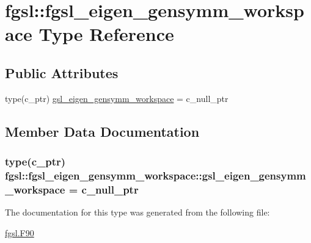 \hypertarget{structfgsl_1_1fgsl__eigen__gensymm__workspace}{}\section{fgsl\+:\+:fgsl\+\_\+eigen\+\_\+gensymm\+\_\+workspace Type Reference}
\label{structfgsl_1_1fgsl__eigen__gensymm__workspace}
\subsection*{Public Attributes}
\begin{DoxyCompactItemize}
\item 
type(c\+\_\+ptr) \hyperlink{structfgsl_1_1fgsl__eigen__gensymm__workspace_af54735f9be07ab0669882fef98e7a790}{gsl\+\_\+eigen\+\_\+gensymm\+\_\+workspace} = c\+\_\+null\+\_\+ptr
\end{DoxyCompactItemize}


\subsection{Member Data Documentation}
\hypertarget{structfgsl_1_1fgsl__eigen__gensymm__workspace_af54735f9be07ab0669882fef98e7a790}{}
\subsubsection[{gsl\+\_\+eigen\+\_\+gensymm\+\_\+workspace}]{\setlength{\rightskip}{0pt plus 5cm}type(c\+\_\+ptr) fgsl\+::fgsl\+\_\+eigen\+\_\+gensymm\+\_\+workspace\+::gsl\+\_\+eigen\+\_\+gensymm\+\_\+workspace = c\+\_\+null\+\_\+ptr}\label{structfgsl_1_1fgsl__eigen__gensymm__workspace_af54735f9be07ab0669882fef98e7a790}


The documentation for this type was generated from the following file\+:\begin{DoxyCompactItemize}
\item 
\hyperlink{fgsl_8F90}{fgsl.\+F90}\end{DoxyCompactItemize}
